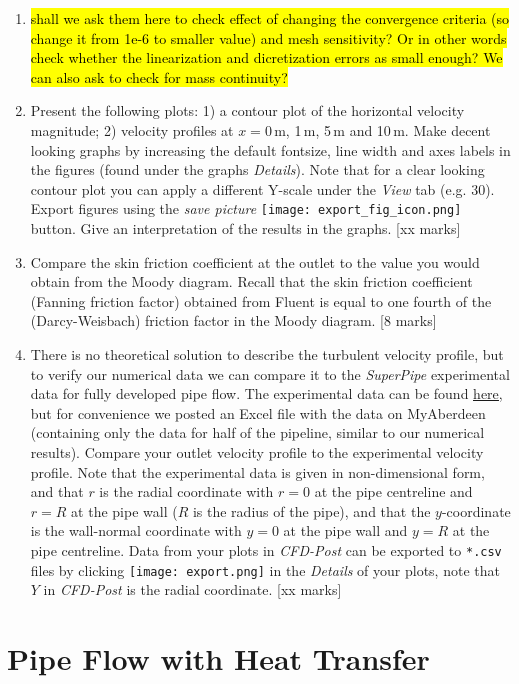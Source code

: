 \documentclass[11pt,a4paper,oneside]{scrartcl}
\begin{document}
\begin{enumerate}
\item \hl{shall we ask them here to check effect of changing the convergence criteria (so change it from 1e-6 to smaller value) and mesh sensitivity? Or in other words check whether the linearization and dicretization errors as small enough? We can also ask to check for mass continuity?}
\item Present the following plots: 1) a contour plot of the horizontal velocity magnitude; 2) velocity profiles at $x=0$\,m, 1\,m, 5\,m and 10\,m. Make decent looking graphs by increasing the default fontsize, line width and axes labels in the figures (found under the graphs \emph{Details}). Note that for a clear looking contour plot you can apply a different Y-scale under the \emph{View} tab (e.g. 30). Export figures using the \emph{save picture} \texttt{[image: export\_fig\_icon.png]} button. Give an interpretation of the results in the graphs. [xx marks]
\item Compare the skin friction coefficient at the outlet to the value you would obtain from the Moody diagram. Recall that the skin friction coefficient (Fanning friction factor) obtained from Fluent is equal to one fourth of the (Darcy-Weisbach) friction factor in the Moody diagram. [8 marks]
\item There is no theoretical solution to describe the turbulent velocity profile, but to verify our numerical data we can compare it to the \emph{SuperPipe} experimental data for fully developed pipe flow. The experimental data can be found  \href{http://www.princeton.edu/~gasdyn/Superpipe_data/3.1577E+04.txt}{\underline{here}}, but for convenience we posted an Excel file with the data on MyAberdeen (containing only the data for half of the pipeline, similar to our numerical results). Compare your outlet velocity profile to the experimental velocity profile. Note that the experimental data is given in non-dimensional form, and that $r$ is the radial coordinate with $r=0$ at the pipe centreline and $r=R$ at the pipe wall ($R$ is the radius of the pipe), and that the $y$-coordinate is the wall-normal coordinate with $y=0$ at the pipe wall and $y=R$ at the pipe centreline. Data from your plots in \emph{CFD-Post} can be exported to \texttt{*.csv} files by clicking \texttt{[image: export.png]} in the \emph{Details} of your plots, note that $Y$ in \emph{CFD-Post} is the radial coordinate. [xx marks]
\end{enumerate}

\section{Pipe Flow with Heat Transfer}\label{Part2}
\end{document}
